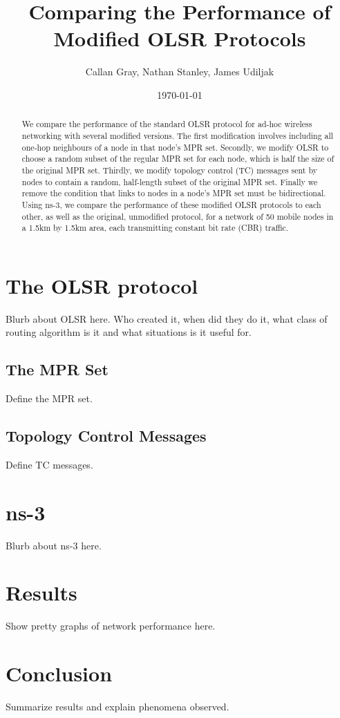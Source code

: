 \documentclass[12pt,a4paper]{article}
\title{Comparing the Performance of Modified OLSR Protocols}
\author{Callan Gray, Nathan Stanley, James Udiljak}
\date{\today}
\begin{document}
\maketitle

\begin{abstract}
We compare the performance of the standard OLSR protocol for ad-hoc wireless networking with several modified versions. The first modification involves including all one-hop neighbours of a node in that node's MPR set. Secondly, we modify OLSR to choose a random subset of the regular MPR set for each node, which is half the size of the original MPR set. Thirdly, we modify topology control (TC) messages sent by nodes to contain a random, half-length subset of the original MPR set. Finally we remove the condition that links to nodes in a node's MPR set must be bidirectional. Using ns-3, we compare the performance of these modified OLSR protocols to each other, as well as the original, unmodified protocol, for a network of 50 mobile nodes in a 1.5km by 1.5km area, each transmitting constant bit rate (CBR) traffic.
\end{abstract}

\section{The OLSR protocol}
Blurb about OLSR here. Who created it, when did they do it, what class of routing algorithm is it and  what situations is it useful for. \cite{clausen2003optimized}

\subsection{The MPR Set}
Define the MPR set.

\subsection{Topology Control Messages}
Define TC messages.

\section{ns-3}
Blurb about ns-3 here.

\section{Results}
Show pretty graphs of network performance here.

\section{Conclusion}
Summarize results and explain phenomena observed.



\end{document}
